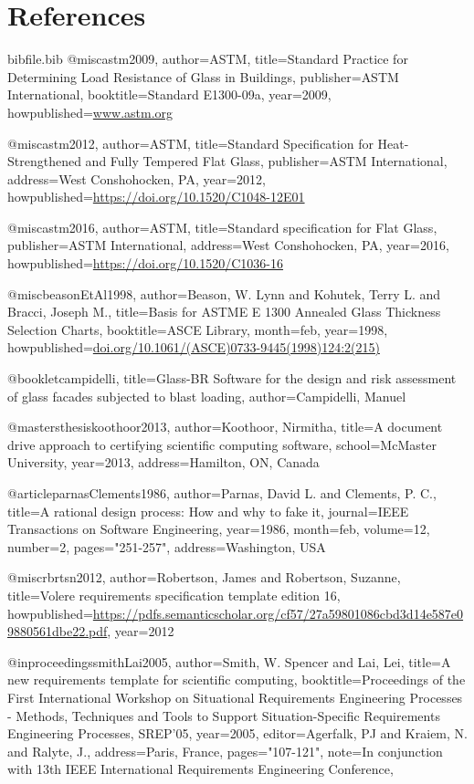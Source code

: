 \documentclass[12pt]{article}
\begin{document}
\section{References}
\label{Sec:References}
\begin{filecontents*}{bibfile.bib}
@misc{astm2009,
author={ASTM},
title={Standard Practice for Determining Load Resistance of Glass in Buildings},
publisher={ASTM International},
booktitle={Standard E1300-09a},
year={2009},
howpublished={\url{www.astm.org}}}

@misc{astm2012,
author={ASTM},
title={Standard Specification for Heat-Strengthened and Fully Tempered Flat Glass},
publisher={ASTM International},
address={West Conshohocken, PA},
year={2012},
howpublished={\url{https://doi.org/10.1520/C1048-12E01}}}

@misc{astm2016,
author={ASTM},
title={Standard specification for Flat Glass},
publisher={ASTM International},
address={West Conshohocken, PA},
year={2016},
howpublished={\url{https://doi.org/10.1520/C1036-16}}}

@misc{beasonEtAl1998,
author={Beason, W. Lynn and Kohutek, Terry L. and Bracci, Joseph M.},
title={Basis for ASTME E 1300 Annealed Glass Thickness Selection Charts},
booktitle={ASCE Library},
month=feb,
year={1998},
howpublished={\url{doi.org/10.1061/(ASCE)0733-9445(1998)124:2(215)}}}

@booklet{campidelli,
title={Glass-BR Software for the design and risk assessment of glass facades subjected to blast loading},
author={Campidelli, Manuel}}

@mastersthesis{koothoor2013,
author={Koothoor, Nirmitha},
title={A document drive approach to certifying scientific computing software},
school={McMaster University},
year={2013},
address={Hamilton, ON, Canada}}

@article{parnasClements1986,
author={Parnas, David L. and Clements, P. C.},
title={A rational design process: How and why to fake it},
journal={IEEE Transactions on Software Engineering},
year={1986},
month=feb,
volume={12},
number={2},
pages={"251-257"},
address={Washington, USA}}

@misc{rbrtsn2012,
author={Robertson, James and Robertson, Suzanne},
title={Volere requirements specification template edition 16},
howpublished={\url{https://pdfs.semanticscholar.org/cf57/27a59801086cbd3d14e587e09880561dbe22.pdf}},
year={2012}}

@inproceedings{smithLai2005,
author={Smith, W. Spencer and Lai, Lei},
title={A new requirements template for scientific computing},
booktitle={Proceedings of the First International Workshop on Situational Requirements Engineering Processes - Methods, Techniques and Tools to Support Situation-Specific Requirements Engineering Processes, SREP'05},
year={2005},
editor={Agerfalk, PJ and Kraiem, N. and Ralyte, J.},
address={Paris, France},
pages={"107-121"},
note={In conjunction with 13th IEEE International Requirements Engineering Conference,}}
\end{filecontents*}
\nocite{*}
\printbibliography[heading=none]
\end{document}

